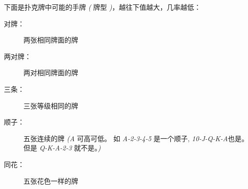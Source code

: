 \begin{exercise}
\label{poker}


下面是扑克牌中可能的手牌 {\em (} 牌型 {\em )}，越往下值越大，几率越低：

\begin{description}


\item [对牌：] 两张相同牌面的牌

\item [两对牌：] 两对相同牌面的牌

\item [三条：] 三张等级相同的牌

\item [顺子：] 五张连续的牌 {\em (A} 可高可低。  如 {\em A-2-3-4-5} 是一个顺子, {\em 10-J-Q-K-A}也是。  但是 {\em Q-K-A-2-3} 就不是。{\em )}

\item [同花：] 五张花色一样的牌


\end{description}
\end{exercise}

